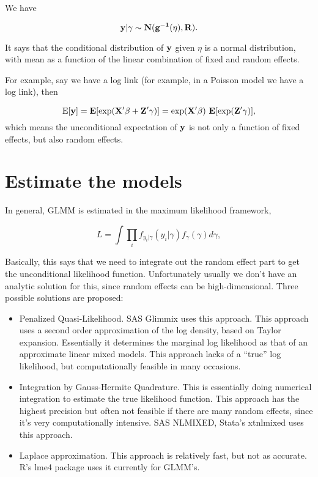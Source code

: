 We have 

\[\bf y |  \gamma \sim  N(g^{-1}( \eta) , R). \]

It says that the conditional distribution of $\bf y$ given $\eta$ is a
normal distribution, with mean as a function of the linear combination
of fixed and random effects.

For example, say we have a log link (for example, in a Poisson model we have a log link), then 

\[ \bf {\rm E}[y] = E[ {\rm exp} (X' \beta + Z' \gamma)] ={\rm exp}(X' \beta) \ E[{\rm exp} (Z' \gamma)], \]
which means the unconditional expectation of $\bf y$ is not only a function of fixed effects, but also random effects.


\section{Estimate the models}

In general, GLMM is estimated in the maximum likelihood framework, 

\[ L= \int \prod_i f_{y_i | \gamma}(y_i | \gamma) f_{\gamma} (\gamma) d \gamma, \]



Basically, this says that we need to integrate out the random effect part to get the unconditional likelihood function.  Unfortunately usually we don't have an analytic solution for this, since random effects can be high-dimensional.  Three possible solutions are proposed:
\begin{itemize}
\item Penalized Quasi-Likelihood.  SAS Glimmix uses this approach.  This approach uses a second order approximation of the log density, based on Taylor expansion.  Essentially it determines the marginal log likelihood as that of an approximate linear mixed models.  This approach lacks of a ``true'' log likelihood, but computationally feasible in many occasions.
\item Integration by Gauss-Hermite Quadrature.  This is essentially doing numerical integration to estimate the true likelihood function.  This approach has the highest precision but often not feasible if there are many random effects, since it's very computationally intensive.  SAS NLMIXED, Stata's xtnlmixed uses this approach.
\item Laplace approximation.  This approach is relatively fast, but not as accurate.  R's lme4 package uses it currently for GLMM's.
\end{itemize}
